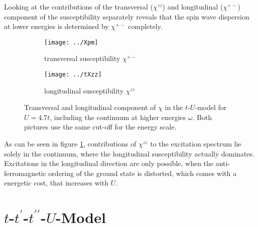 \documentclass[a4paper,12pt]{report}
\begin{document}
Looking at the contributions of the transversal ($\chi^{zz}$) and longitudinal ($\chi^{+-}$) component of the susceptibility separately reveals 
that the spin wave dispersion at lower energies is determined by $\chi^{+-}$ completely.
\begin{figure}
 \centering
 \begin{subfigure}{.49\linewidth}
\texttt{[image: ../Xpm]}
  \caption{transversal susceptibility $\chi^{+-}$}
 \end{subfigure}
\begin{subfigure}{.49\linewidth}
 \texttt{[image: ../tXzz]}
 \caption{longitudinal susceptibility $\chi^{zz}$}
\end{subfigure}
\caption{Transversal and longitudinal component of $\chi$ in the $t$-$U$-model for $U=4.7t$, including the continuum at higher energies $\omega$. 
	 Both pictures use the same cut-off for the energy scale.}
	 \label{Xcomponents}
\end{figure}
%
As can be seen in figure \ref{Xcomponents}, contributions of $\chi^{zz}$ to the excitation spectrum lie solely in the continuum,
where the longitudinal susceptibility actually dominates.
Excitations in the longitudinal direction are only possible, when the anti-ferromagnetic ordering of the ground state 
is distorted, which comes with a energetic cost, that increases with $U$.











 










\section{$t$-$t^{\prime}$-$t^{\prime \prime}$-$U$-Model}
\end{document}
